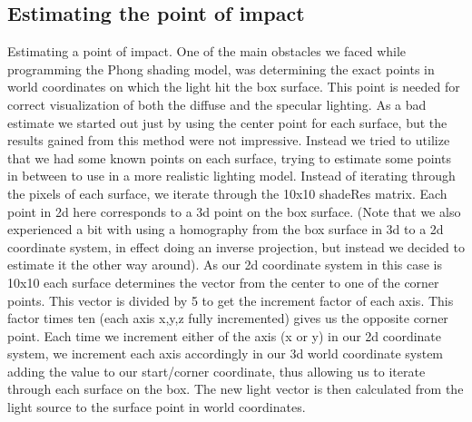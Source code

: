 \subsection{Estimating the point of impact}
Estimating a point of impact. 
One of the main obstacles we faced while programming the Phong shading model, was determining the exact points in world coordinates on which the light hit the box surface. This point is needed for correct visualization of both the diffuse and the specular lighting. As a bad estimate we started out just by using the center point for each surface, but the results gained from this method were not impressive. Instead we tried to utilize that we had some known points on each surface, trying to estimate some points in between to use in a more realistic lighting model. 
Instead of iterating through the pixels of each surface, we iterate through the 10x10 shadeRes matrix. Each point in 2d here corresponds to a 3d point on the box surface. (Note that we also experienced a bit with using a homography from the box surface in 3d to a 2d coordinate system, in effect doing an inverse projection, but instead we decided to estimate it the other way around).
As our 2d coordinate system in this case is 10x10  each surface determines the vector from the center to one of the corner points. This vector is divided by 5 to get the increment factor of each axis. This factor times ten (each axis x,y,z fully incremented) gives us the opposite corner point. Each time we increment either of the axis (x or y) in  our 2d coordinate system, we increment each axis accordingly in our 3d world coordinate system adding the value to our start/corner coordinate, thus allowing us to iterate through each surface on the box. The new light vector is then calculated from the light source to the surface point in world coordinates.

